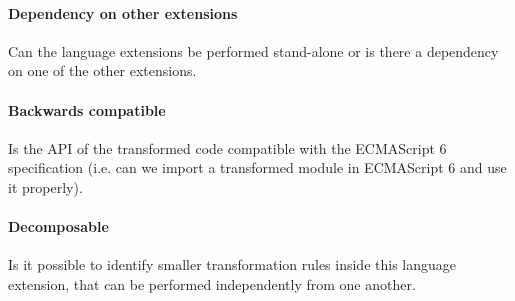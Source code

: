 \paragraph{Dependency on other extensions}
Can the language extensions be performed stand-alone or is there a dependency on one of the other extensions.

\paragraph{Backwards compatible}
Is the API of the transformed code compatible with the ECMAScript 6 specification (i.e. can we import a transformed module in ECMAScript 6 and use it properly).

\paragraph{Decomposable}
Is it possible to identify smaller transformation rules inside this language extension, that can be performed independently from one another.

